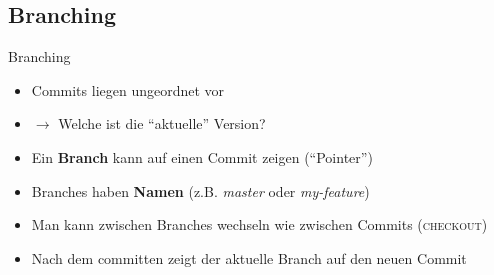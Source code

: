 \documentclass[compress,t]{beamer}
\begin{document}
\subsection{Branching}
\begin{frame}{Branching}
    \begin{itemize}
        \item Commits liegen ungeordnet vor
        \item $\rightarrow$ Welche ist die ``aktuelle'' Version?
        \item Ein \textbf{Branch} kann auf einen Commit zeigen (``Pointer'')
        \item Branches haben \textbf{Namen} (z.B. \textit{master} oder \textit{my-feature})
        \item Man kann zwischen Branches wechseln wie zwischen Commits (\textsc{checkout})
        \item Nach dem committen zeigt der aktuelle Branch auf den neuen Commit
    \end{itemize}
\end{frame}
\end{document}

